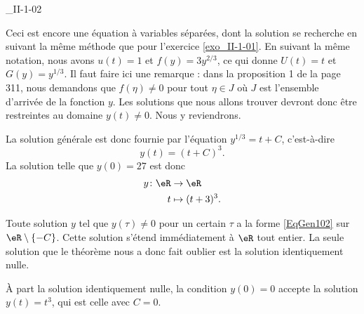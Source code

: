 \begin{corrige}{_II-1-02}

Ceci est encore une équation à variables séparées, dont la solution se recherche en suivant la même méthode que pour l'exercice \ref{exo_II-1-01}. En suivant la même notation, nous avons $u(t)=1$ et $f(y)=3y^{2/3}$, ce qui donne $U(t)=t$ et $G(y)=y^{1/3}$. Il faut faire ici une remarque : dans la proposition 1 de la page 311, nous demandons que $f(\eta)\neq 0$ pour tout $\eta\in J$ où $J$ est l'ensemble d'arrivée de la fonction $y$. Les solutions que nous allons trouver devront donc être restreintes au domaine $y(t)\neq 0$. Nous y reviendrons.

La solution générale est donc fournie par l'équation $y^{1/3}=t+C$, c'est-à-dire
\begin{equation}		\label{EqGen102}
	y(t)=(t+C)^3.
\end{equation}
La solution telle que $y(0)=27$ est donc
\begin{equation}
	\begin{aligned}
		y\colon \eR&\to \eR \\
		t&\mapsto (t+3)^3. 
	\end{aligned}
\end{equation}

Toute solution $y$ tel que $y(\tau)\neq 0$ pour un certain $\tau$ a la forme \eqref{EqGen102} sur $\eR\setminus\{ -C \}$. Cette solution s'étend immédiatement à $\eR$ tout entier. La seule solution que le théorème nous a donc fait oublier est la solution identiquement nulle.

 À part la solution identiquement nulle, la condition $y(0)=0$ accepte la solution $y(t)=t^3$, qui est celle avec $C=0$.

\end{corrige}


